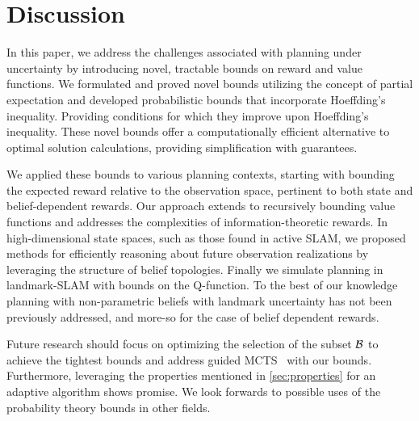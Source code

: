 \section{Discussion}
\label{sec:discussion}
In this paper, we address the challenges associated with planning under uncertainty by introducing novel, tractable bounds on reward and value functions. We formulated and proved novel bounds utilizing the concept of partial expectation and developed probabilistic bounds that incorporate Hoeffding's inequality. Providing conditions for which they improve upon Hoeffding's inequality. These novel bounds offer a computationally efficient alternative to optimal solution calculations, providing simplification with guarantees.

We applied these bounds to various planning contexts, starting with bounding the expected reward relative to the observation space, pertinent to both state and belief-dependent rewards. Our approach extends to recursively bounding value functions and addresses the complexities of information-theoretic rewards. In high-dimensional state spaces, such as those found in active SLAM, we proposed methods for efficiently reasoning about future observation realizations by leveraging the structure of belief topologies. Finally we simulate planning in landmark-SLAM with bounds on the Q-function. To the best of our knowledge planning with non-parametric beliefs with landmark uncertainty has not been previously addressed, and more-so for the case of belief dependent rewards.

Future research should focus on optimizing the selection of the subset $\mathcal B$ to achieve the tightest bounds and address guided MCTS~\cite{Silver10nips} with our bounds. Furthermore, leveraging the properties mentioned in \cref{sec:properties} for an adaptive algorithm shows promise. We look forwards to possible uses of the probability theory bounds in other fields.
